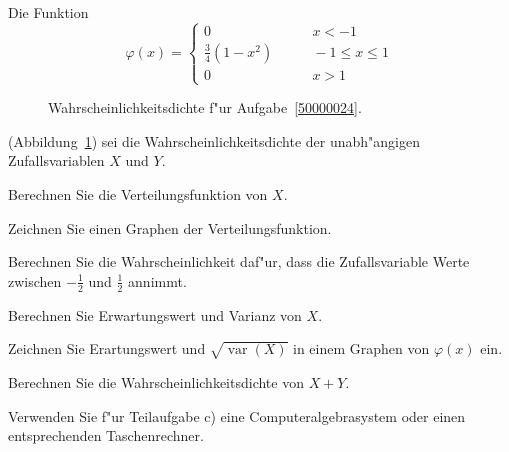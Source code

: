 Die Funktion
\[
\varphi(x)=\begin{cases}
0&\qquad x< -1\\
\frac34(1-x^2)&\qquad -1\le x\le 1\\
0&\qquad x > 1
\end{cases}
\]
\begin{figure}[h]
\centering
{}
\caption{Wahrscheinlichkeitsdichte f"ur Aufgabe~\ref{50000024}.
\label{50000024:dichte}}
\end{figure}
(Abbildung~\ref{50000024:dichte})
sei die Wahrscheinlichkeitsdichte der unabh"angigen Zufallsvariablen
$X$ und $Y$.
\begin{teilaufgaben}
\item Berechnen Sie die Verteilungsfunktion von $X$.
\item Zeichnen Sie einen Graphen der Verteilungsfunktion.
\item Berechnen Sie die Wahrscheinlichkeit daf"ur, dass die Zufallsvariable
Werte zwischen $-\frac12$ und $\frac12$ annimmt.
\item Berechnen Sie Erwartungswert und Varianz von $X$.
\item Zeichnen Sie Erartungswert und $\sqrt{\operatorname{var}(X)}$ in
einem Graphen von $\varphi(x)$ ein.
\item Berechnen Sie die Wahrscheinlichkeitsdichte von $X+Y$.
\end{teilaufgaben}

\begin{hinweis}
Verwenden Sie f"ur Teilaufgabe c) eine Computeralgebrasystem oder einen
entsprechenden Taschenrechner.
\end{hinweis}

